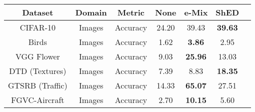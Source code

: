 \documentclass{article}
\begin{document}
\begin{table}
\centering
\begin{tabular}{ccccccc}
\toprule
Dataset          & Domain   & Metric        & None    & e-Mix   & ShED   \\
\midrule
CIFAR-10         & Images   & Accuracy       & 24.20 & 39.43 & \textbf{39.63}  \\
Birds            & Images   & Accuracy       & 1.62  & \textbf{3.86}  & 2.95   \\
VGG Flower          & Images   & Accuracy    & 9.03  & \textbf{25.96} & 13.03  \\
DTD (Textures)        & Images   & Accuracy  & 7.39  & 8.83  & \textbf{18.35}  \\
GTSRB (Traffic)    & Images   & Accuracy     & 14.33 & \textbf{65.07} & 27.51  \\
FGVC-Aircraft        & Images   & Accuracy   & 2.70  & \textbf{10.15} & 5.60   \\


\end{tabular}
\end{table}
\end{document}
